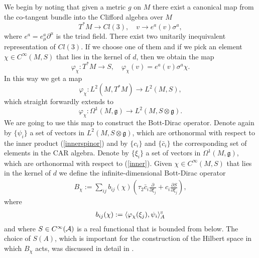 \documentclass[letterpaper,11pt]{article}
\newcommand{\nn}{\nonumber}
\def\m{\mu}
\def\OO{\Omega}
\def\ca{{\cal A}}
\newcommand{\pa}{\partial}
\begin{document}
We begin by noting that given a metric $g$ on $M$ there exist a canonical map from the co-tangent bundle into the Clifford algebra over $M$ 
$$
T^*M\rightarrow Cl(3), \quad v\rightarrow e^a(v)\sigma^a,
$$ 
where $e^a = e^a_\m \pa^\m$ is the triad field. There exist two unitarily inequivalent representation of $Cl(3)$. If we choose one of them and if we pick an element $\chi \in C^\infty(M,S)$ that lies in the kernel of $d$, then we obtain the map
\begin{equation}
\varphi_\chi: T^*M \rightarrow S,\quad \varphi_\chi(v) = e^a(v)\sigma^a \chi .
\end{equation}
In this way we get a map
$$
\varphi_\chi: L^2(M, T^*M)\rightarrow L^2(M,S),
$$
which straight forwardly extends to
$$
\varphi_\chi: \OO^1(M,\mathfrak{g})\rightarrow L^2(M,S\otimes\mathfrak{g}).
$$
We are going to use this map to construct the Bott-Dirac operator.
Denote again by $\{{\psi}_i\}$ a set of vectors in $L^2(M,S\otimes \mathfrak{g})$, which are orthonormal with respect to the inner product (\ref{innerspinor}) and by $\{c_i\}$ and $\{ \bar{c}_i \}$ the corresponding set of elements in the CAR algebra. Denote by $\{\xi_i\}$ a set of vectors in $\OO^1(M,\mathfrak{g})$, which are orthonormal with respect to (\ref{inner}).  
Given  $\chi \in C^\infty(M,S)$ that lies in the kernel of $d$ we define the infinite-dimensional Bott-Dirac operator
\begin{eqnarray}
B_\chi %
:=  \sum_{ij} b_{ij}(\chi)  \left(  \tau_2  \bar{c}_i      \frac{\pa}{\pa\xi_{j }} +    {c}_{i} \frac{\pa S}{\pa \xi_j}\right),
\label{F1}
\end{eqnarray}
where
\begin{eqnarray}
b_{ij} (\chi) :=  \langle {\varphi}_\chi(\xi_j), \psi_i \rangle_{A}^{\mbox{\tiny S}}
\label{b}
\end{eqnarray}
and where $S\in C^\infty(\ca)$ is a real functional that is bounded from below. The choice of $S(A)$, which is important for the construction of the Hilbert space in which $B_\chi$ acts, was discussed in detail in \cite{Aastrup:2019yui}. 
\end{document}
